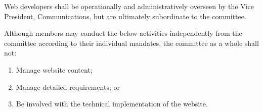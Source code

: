 Web developers shall be operationally and administratively overseen by the Vice President, Communications, but are ultimately subordinate to the committee.

Although members may conduct the below activities independently from the committee according to their individual mandates, the committee as a whole shall not:
\begin{enumerate}
  \item Manage website content;
  \item Manage detailed requirements; or
  \item Be involved with the technical implementation of the website.
\end{enumerate}

